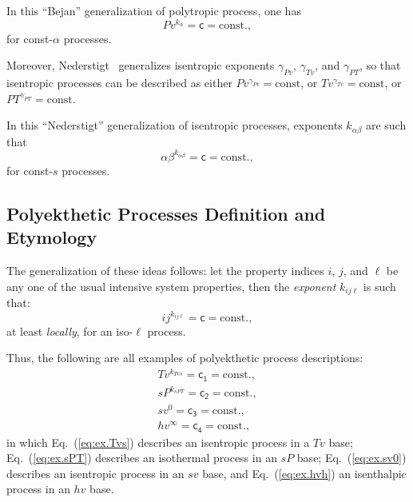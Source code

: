     In this ``Bejan'' generalization of polytropic process, one has
    \begin{equation}
        Pv^{k_{\alpha}} = \mathsf{c} = \mbox{const.},
        \label{eq:gen.Bejan}
    \end{equation}
    \noindent for const-$\alpha$ processes.

    Moreover,  Nederstigt~\cite{2017-NederstigtP-TUDelft}   generalizes   isentropic   exponents
    $\gamma_{Pv}$, $\gamma_{Tv}$,  and  $\gamma_{PT}$,  so  that  isentropic  processes  can  be
    described as either $Pv^{\gamma_{Pv}} = \mbox{const}$, or $Tv^{\gamma_{Tv}} = \mbox{const}$,
    or $PT^{\gamma_{PT}} = \mbox{const}$.

    In this ``Nederstigt'' generalization of isentropic processes,  exponents  $k_{\alpha\beta}$
    are such that
    \begin{equation}
        \alpha\beta^{k_{\alpha\beta}} = \mathsf{c} = \mbox{const.},
        \label{eq:gen.Nederstigt}
    \end{equation}
    \noindent for const-$s$ processes.

    \subsection{Polyekthetic Processes Definition and Etymology}

    The generalization of these ideas follows: let the property indices $i$, $j$, and $\ell$  be
    any one of the usual intensive system properties, then the \emph{exponent}  $k_{ij\ell}$  is
    such that:
    \begin{equation}
        ij^{k_{ij\ell}} = \mathsf{c} = \mbox{const.},
        \label{eq:polyekthetic}
    \end{equation}
    \noindent at least \emph{locally}, for an iso-$\ell$ process.

    Thus, the following are all examples of polyekthetic process descriptions:
    \begin{align}
        Tv^{k_{Tvs}} = \mathsf{c_1} = \mbox{const.}, \label{eq:ex.Tvs} \\
        sP^{k_{sPT}} = \mathsf{c_2} = \mbox{const.}, \label{eq:ex.sPT} \\
        sv^0 = \mathsf{c_3} = \mbox{const.}, \label{eq:ex.sv0} \\
        hv^{\infty} = \mathsf{c_4} = \mbox{const.}, \label{eq:ex.hvh}
    \end{align}
    \noindent in which Eq.~(\ref{eq:ex.Tvs}) describes an isentropic process  in  a  $Tv$  base;
    Eq.~(\ref{eq:ex.sPT}) describes an isothermal process in an $sP$ base; Eq.~(\ref{eq:ex.sv0})
    describes an isentropic process in an $sv$ base, and  Eq.~(\ref{eq:ex.hvh})  an  isenthalpic
    process in an $hv$ base.

